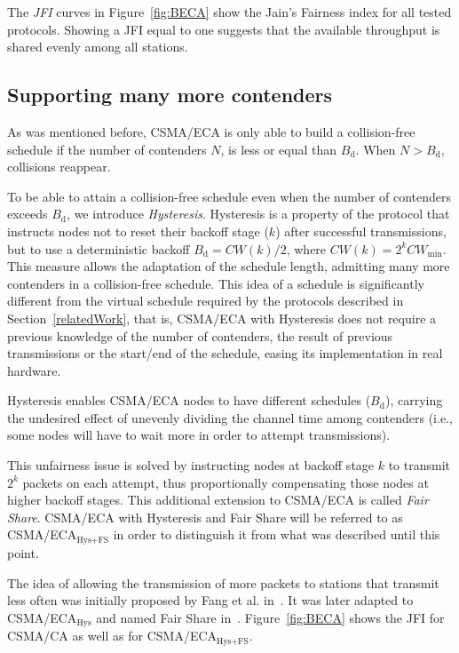 The \emph{JFI } curves in Figure~\ref{fig:BECA} show the Jain's Fairness index for all tested protocols. Showing a JFI equal to one suggests that the available throughput is shared evenly among all stations.

	\subsection{Supporting many more contenders}\label{moreContenders}
	As was mentioned before, CSMA/ECA is only able to build a collision-free schedule if the number of contenders $N$, is less or equal than $B_{\text{d}}$. When $N > B_{\text{d}}$, collisions reappear. 
	
	To be able to attain a collision-free schedule even when the number of contenders exceeds $B_{\text{d}}$, we introduce \emph{Hysteresis}. Hysteresis is a property of the protocol that instructs nodes not to reset their backoff stage ($k$) after successful transmissions, but to use a deterministic backoff $B_{\text{d}}=CW(k)/2$, where $CW(k)=2^{k}CW_{\min}$. This measure allows the adaptation of the schedule length, admitting many more contenders in a collision-free schedule. This idea of a schedule is significantly different from the virtual schedule required by the protocols described in Section~\ref{relatedWork}, that is, CSMA/ECA with Hysteresis does not require a previous knowledge of the number of contenders, the result of previous transmissions or the start/end of the schedule, easing its implementation in real hardware.
	
	Hysteresis enables CSMA/ECA nodes to have different schedules ($B_{\text{d}}$), carrying the undesired effect of unevenly dividing the channel time among contenders (i.e., some nodes will have to wait more in order to attempt transmissions).
	
	This unfairness issue is solved by instructing nodes at backoff stage $k$ to transmit $2^{k}$ packets on each attempt, thus proportionally compensating those nodes at higher backoff stages. This additional extension to CSMA/ECA is called \emph{Fair Share}. CSMA/ECA with Hysteresis and Fair Share will be referred to as CSMA/ECA$_{\text{Hys+FS}}$ in order to distinguish it from what was described until this point.
	
	The idea of allowing the transmission of more packets to stations that transmit less often was initially proposed by Fang et al. in~\cite{L_MAC}. It was later adapted to CSMA/ECA$_{\text{Hys}}$ and named Fair Share in~\cite{research2standards}. Figure~\ref{fig:BECA} shows the JFI for CSMA/CA as well as for CSMA/ECA$_{\text{Hys+FS}}$.
	
